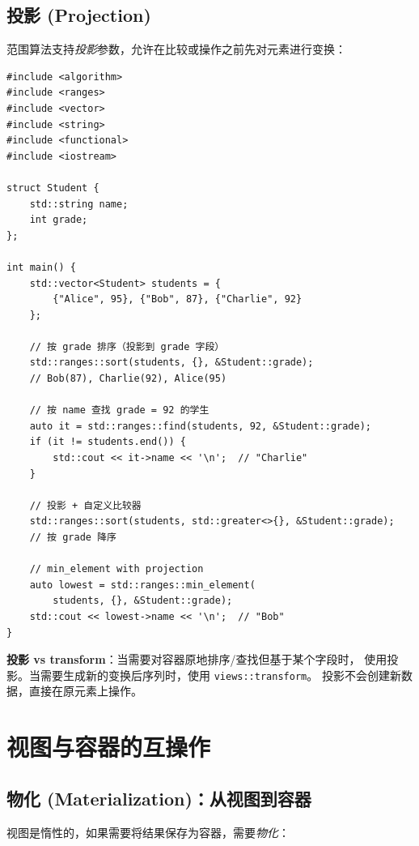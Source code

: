 \documentclass[12pt,a4paper,fontset=fandol]{ctexbook}
\begin{document}
\section{投影 (Projection)}

范围算法支持\emph{投影}参数，允许在比较或操作之前先对元素进行变换：

\begin{lstlisting}
#include <algorithm>
#include <ranges>
#include <vector>
#include <string>
#include <functional>
#include <iostream>

struct Student {
    std::string name;
    int grade;
};

int main() {
    std::vector<Student> students = {
        {"Alice", 95}, {"Bob", 87}, {"Charlie", 92}
    };

    // 按 grade 排序（投影到 grade 字段）
    std::ranges::sort(students, {}, &Student::grade);
    // Bob(87), Charlie(92), Alice(95)

    // 按 name 查找 grade = 92 的学生
    auto it = std::ranges::find(students, 92, &Student::grade);
    if (it != students.end()) {
        std::cout << it->name << '\n';  // "Charlie"
    }

    // 投影 + 自定义比较器
    std::ranges::sort(students, std::greater<>{}, &Student::grade);
    // 按 grade 降序

    // min_element with projection
    auto lowest = std::ranges::min_element(
        students, {}, &Student::grade);
    std::cout << lowest->name << '\n';  // "Bob"
}
\end{lstlisting}

\begin{bestpractice}
\textbf{投影 vs transform}：当需要对容器原地排序/查找但基于某个字段时，
使用投影。当需要生成新的变换后序列时，使用 \texttt{views::transform}。
投影不会创建新数据，直接在原元素上操作。
\end{bestpractice}

\chapter{视图与容器的互操作}

\section{物化 (Materialization)：从视图到容器}

视图是惰性的，如果需要将结果保存为容器，需要\emph{物化}：
\end{document}
